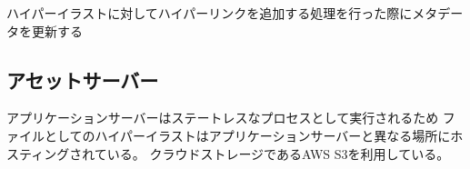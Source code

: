 ハイパーイラストに対してハイパーリンクを追加する処理を行った際にメタデータを更新する




\subsection{アセットサーバー}
アプリケーションサーバーはステートレスなプロセスとして実行されるため
ファイルとしてのハイパーイラストはアプリケーションサーバーと異なる場所にホスティングされている。
クラウドストレージであるAWS S3を利用している。


